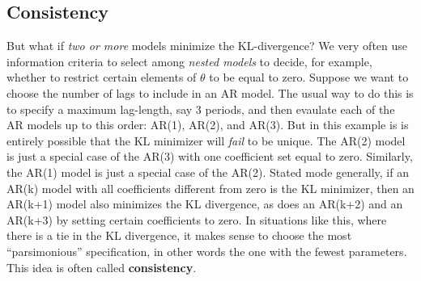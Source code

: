 \documentclass[12pt]{article}
\theoremstyle{definition}
\begin{document}
\subsection{Consistency}
But what if \emph{two or more} models minimize the KL-divergence? We very often use information criteria to select among \emph{nested models} to decide, for example, whether to restrict certain elements of $\theta$ to be equal to zero. Suppose we want to choose the number of lags to include in an AR model. The usual way to do this is to specify a maximum lag-length, say 3 periods, and then evaulate each of the AR models up to this order: AR(1), AR(2), and AR(3). But in this example is is entirely possible that the KL minimizer will \emph{fail} to be unique. The AR(2) model is just a special case of the AR(3) with one coefficient set equal to zero. Similarly, the AR(1) model is just a special case of the AR(2). Stated mode generally, if an AR(k) model with all coefficients different from zero is the KL minimizer, then an AR(k+1) model also minimizes the KL divergence, as does an AR(k+2) and an AR(k+3) by setting certain coefficients to zero. In situations like this, where there is a tie in the KL divergence, it makes sense to choose the most ``parsimonious'' specification, in other words the one with the fewest parameters. This idea is often called \textbf{consistency}.
\end{document}
